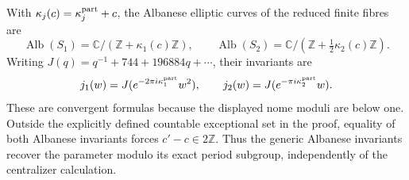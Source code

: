 \begin{proposition}\hypertarget{tag-01Q3}{}\label{fam:src:A.4.1}\label{fam:st:A.4.1}

With $\kappa_j(c)=\kappa_j^{\rm part}+c$, the Albanese elliptic curves of the reduced finite fibres are
\[
 \operatorname{Alb}(S_1)=\mathbb C/(\mathbb Z+\kappa_1(c)\mathbb Z),\qquad
 \operatorname{Alb}(S_2)=\mathbb C/(\mathbb Z+\tfrac12\kappa_2(c)\mathbb Z).
\]
Writing $J(q)=q^{-1}+744+196884q+\cdots$, their invariants are
\[
 j_1(w)=J(e^{-2\pi i\kappa_1^{\rm part}}w^2),\qquad
 j_2(w)=J(e^{-\pi i\kappa_2^{\rm part}}w).
\]
These are convergent formulas because the displayed nome moduli are below one. Outside the explicitly defined countable exceptional set in the proof, equality of both Albanese invariants forces $c'-c\in2\mathbb Z$. Thus the generic Albanese invariants recover the parameter modulo its exact period subgroup, independently of the centralizer calculation.
\end{proposition}


